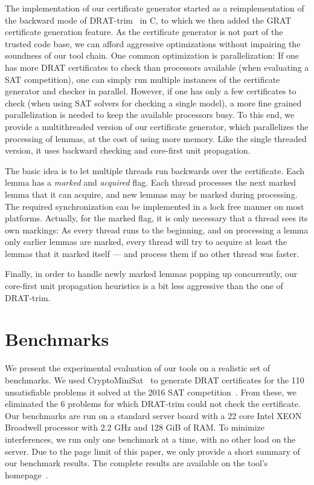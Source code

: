 \documentclass{llncs}
\newcommand\CC{C\nolinebreak[4]\hspace{-.05em}\raisebox{.4ex}{\relsize{-3}{\textbf{++}}}}
\begin{document}
The implementation of our certificate generator started as a reimplementation of the backward mode of DRAT-trim~\cite{WHH13,drat-trim-webpage} in \CC, to 
which we then added the GRAT certificate generation feature. 
As the certificate generator is not part of the trusted code base, we can afford aggressive optimizations without impairing the soundness of our tool chain.
One common optimization is parallelization: If one has more DRAT certificates to check than processors 
available (\eg when evaluating a SAT competition), one can simply run multiple instances of the certificate generator and checker in parallel.
However, if one has only a few certificates to check (\eg when using SAT solvers for checking a single model), a more fine grained parallelization 
is needed to keep the available processors busy. To this end, we provide a multithreaded version of our certificate generator, 
which parallelizes the processing of lemmas, at the cost of using more memory. Like the single threaded version, it uses backward checking and 
core-first unit propagation.

The basic idea is to let multiple threads run backwards over the certificate. Each lemma has a \emph{marked} and \emph{acquired} flag. 
Each thread processes the next marked lemma that it can acquire, and new lemmas may be marked during processing.
The required synchronization can be implemented in a lock free manner on most platforms. 
Actually, for the marked flag, it is only necessary that a thread sees its own markings: As every thread runs to the beginning, 
and on processing a lemma only earlier lemmas are marked, every thread will try to acquire at least the lemmas that it marked itself --- and 
process them if no other thread was faster. 

Finally, in order to handle newly marked lemmas popping up concurrently, our 
core-first unit propagation heuristics is a bit less aggressive than the one of DRAT-trim.

\section{Benchmarks}\label{sec:benchmarks}
We present the experimental evaluation of our tools on a realistic set of benchmarks.
We used CryptoMiniSat~\cite{SNC09,SATCOMP16} to generate DRAT certificates for the 110 unsatisfiable problems it solved at the 2016 SAT competition~\cite{satcomp-2016}.
From these, we eliminated the 6 problems for which DRAT-trim could not check the certificate.
Our benchmarks are run on a standard server board with a 22 core Intel XEON Broadwell processor with 2.2 GHz and 128 GiB of RAM.
To minimize interferences, we run only one benchmark at a time, with no other load on the server. 
Due to the page limit of this paper, we only provide a short summary of our benchmark results. The complete results are available on the tool's homepage~\cite{??}.
\end{document}
